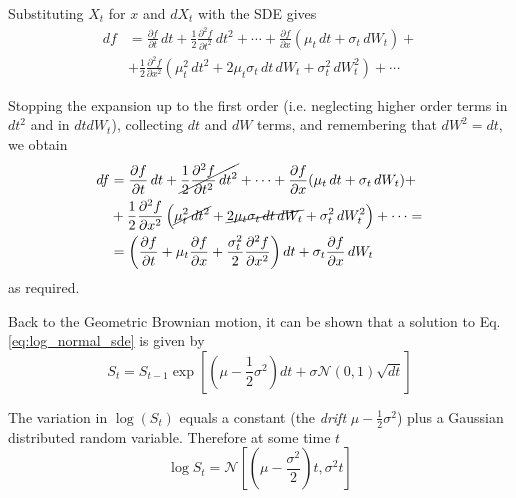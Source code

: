 \documentclass[12pt,a4paper]{book}
\begin{document}
Substituting $X_t$ for $x$ and $dX_t$ with the SDE gives
\begin{equation*}
\begin{aligned}
df&={\frac {\partial f}{\partial t}}\,dt+{\frac {1}{2}}{\frac {\partial ^{2}f}{\partial t^{2}}}\,dt^{2}+\cdots +{\frac {\partial f}{\partial x}}(\mu _{t}\,dt+\sigma _{t}\,dW_{t})+\\
&+{\frac {1}{2}}{\frac {\partial ^{2}f}{\partial x^{2}}}\left(\mu _{t}^{2}\,dt^{2}+2\mu _{t}\sigma _{t}\,dt\,dW_{t}+\sigma _{t}^{2}\,dW_{t}^{2}\right)+\cdots
\end{aligned}
\end{equation*}

Stopping the expansion up to the first order (i.e. neglecting higher order terms in $dt^2$ and in $dt dW_t$), collecting $dt$ and $dW$ terms, and remembering that $dW^2=dt$, we obtain
\begin{equation*}
\begin{aligned}
df&={\frac {\partial f}{\partial t}}\,dt+\cancel{{\frac {1}{2}}{\frac {\partial ^{2}f}{\partial t^{2}}}\,dt^{2}}+\cdots +{\frac {\partial f}{\partial x}}(\mu _{t}\,dt+\sigma _{t}\,dW_{t})+\\
&+{\frac {1}{2}}{\frac {\partial ^{2}f}{\partial x^{2}}}\left(\cancel{\mu _{t}^{2}\,dt^{2}}+\cancel{2\mu _{t}\sigma _{t}\,dt\,dW_{t}}+\sigma _{t}^{2}\,dW_{t}^{2}\right)+\cdots =\\
&=\left({\frac {\partial f}{\partial t}}+\mu _{t}{\frac {\partial f}{\partial x}}+{\frac {\sigma _{t}^{2}}{2}}{\frac {\partial ^{2}f}{\partial x^{2}}}\right)dt+\sigma _{t}{\frac {\partial f}{\partial x}}\,dW_{t}
\end{aligned}
\end{equation*}
as required.

Back to the Geometric Brownian motion, it can be shown that a solution to Eq.\ref{eq:log_normal_sde} is given by 
\begin{equation}
S_t = S_{t-1}\exp\left[\left(\mu-\frac{1}{2}\sigma^2\right)dt + \sigma\mathcal{N}(0,1)\sqrt{dt}\right] 
\label{eq:lognormal_solution}
\end{equation}

The variation in $\log(S_t)$ equals a constant (the \emph{drift} $\mu-\frac{1}{2}\sigma^2$) plus a Gaussian distributed random variable. Therefore at some time $t$
\begin{equation*}
\log S_t = \mathcal{N}\left[\left(\mu -\frac{\sigma^2}{2}\right)t, \sigma^2 t\right]
\end{equation*}
\end{document}
